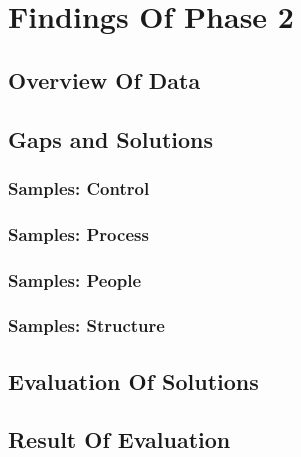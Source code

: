 
\section{Findings Of Phase 2}

\subsection{Overview Of Data}

\subsection{Gaps and Solutions}

\subsubsection{Samples: Control}
\subsubsection{Samples: Process}
\subsubsection{Samples: People}
\subsubsection{Samples: Structure}

\subsection{Evaluation Of Solutions}

\subsection{Result Of Evaluation}
